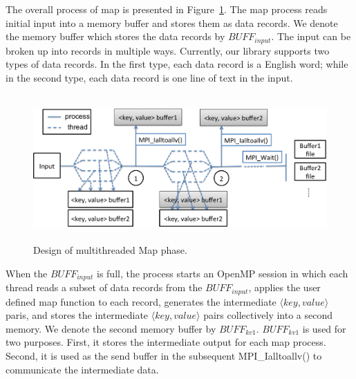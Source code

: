The overall process of map is presented in Figure~\ref{fig:multithreaded_map}.  
The map process reads initial input into a memory buffer and stores them as
data records. We denote the memory buffer which stores the
data records by $BUFF_{input}$. The input can be broken up into records
in multiple ways. Currently, our library supports two types of
data records. In the first type, each data record is a English
word; while in the second type, each data record is one line
of text in the input.
\begin{figure}[!htb]
\centering
  \includegraphics[width=0.8\linewidth,height=2.2in]{figs/multithreaded_map_design.png}
  \caption{Design of multithreaded Map phase.}
  \label{fig:multithreaded_map}
\end{figure}

When the $BUFF_{input}$ is full, the process starts an 
OpenMP session in which
each thread reads a subset of data records from the $BUFF_{input}$, applies the user
defined map function to each record, generates
the intermediate $\langle key, value \rangle$ paris, and stores the intermediate
$\langle key, value \rangle$ pairs collectively into a second memory.
We denote the second memory buffer by $BUFF_{kv1}$.
$BUFF_{kv1}$ is used for two purposes. First, it stores
the intermediate output for each map process. Second,
it is used as the send buffer in the subsequent MPI\_Ialltoallv()
to communicate the intermediate data.


